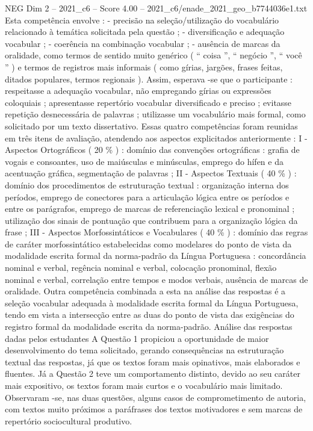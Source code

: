 \begin{textsample}{NEG Dim 2 – 2021\_c6 – Score 4.00 – 2021\_c6/enade\_2021\_geo\_b7744036e1.txt}
Esta competência envolve : - precisão na seleção/utilização do vocabulário relacionado à temática solicitada pela questão ; - diversificação e adequação vocabular ; - coerência na combinação vocabular ; - ausência de marcas da oralidade, como termos de sentido muito genérico ( “ coisa ”, “ negócio ”, “ você ” ) e termos de registros mais informais ( como gírias, jargões, frases feitas, ditados populares, termos regionais ).
Assim, esperava -se que o participante : respeitasse a adequação vocabular, não empregando gírias ou expressões coloquiais ; apresentasse repertório vocabular diversificado e preciso ; evitasse repetição desnecessária de palavras ; utilizasse um vocabulário mais formal, como solicitado por um texto dissertativo.
Essas quatro competências foram reunidas em três itens de avaliação, atendendo aos aspectos explicitados anteriormente : I - Aspectos Ortográficos ( 20 \% ) : domínio das convenções ortográficas : grafia de vogais e consoantes, uso de maiúsculas e minúsculas, emprego do hífen e da acentuação gráfica, segmentação de palavras ; II - Aspectos Textuais ( 40 \% ) : domínio dos procedimentos de estruturação textual : organização interna dos períodos, emprego de conectores para a articulação lógica entre os períodos e entre os parágrafos, emprego de marcas de referenciação lexical e pronominal ; utilização dos sinais de pontuação que contribuem para a organização lógica da frase ; III - Aspectos Morfossintáticos e Vocabulares ( 40 \% ) : domínio das regras de caráter morfossintático estabelecidas como modelares do ponto de vista da modalidade escrita formal da norma-padrão da Língua Portuguesa : concordância nominal e verbal, regência nominal e verbal, colocação pronominal, flexão nominal e verbal, correlação entre tempos e modos verbais, ausência de marcas de oralidade.
Outra competência combinada a esta na análise das respostas é a seleção vocabular adequada à modalidade escrita formal da Língua Portuguesa, tendo em vista a intersecção entre as duas do ponto de vista das exigências do registro formal da modalidade escrita da norma-padrão.
Análise das respostas dadas pelos estudantes A Questão 1 propiciou a oportunidade de maior desenvolvimento do tema solicitado, gerando consequências na estruturação textual das respostas, já que os textos foram mais opinativos, mais elaborados e fluentes.
Já a Questão 2 teve um comportamento distinto, devido ao seu caráter mais expositivo, os textos foram mais curtos e o vocabulário mais limitado.
Observaram -se, nas duas questões, alguns casos de comprometimento de autoria, com textos muito próximos a paráfrases dos textos motivadores e sem marcas de repertório sociocultural produtivo.

\end{textsample}
